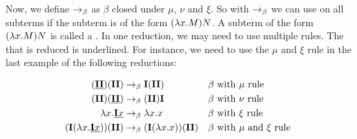 Now, we define $\to_\beta$ as $\beta$ closed under $\mu$, $\nu$ and $\xi$. 
So with $\to_\beta$ we can use \br on all subterms if the subterm is of the form $(\lambda {x}.{M})N$. A subterm of the form $(\lambda {x}.{M})N$ is called a \bre.
In one reduction, we may need to use multiple rules. The \bre that is reduced is underlined.
For instance, we need to use the $\mu$ and $\xi$ rule in the last example of the following reductions: 

\begin{align*}
	(\underline{\mathbf{I} \mathbf{I}})(\mathbf{I} \mathbf{I}) 							&\to_\beta \mathbf{I} (\mathbf{I} \mathbf{I}) 							 & &\beta \text{ with } \mu \text{ rule } \\
	(\mathbf{I} \mathbf{I})(\underline{\mathbf{I} \mathbf{I}}) 							&\to_\beta (\mathbf{I} \mathbf{I}) \mathbf{I} 							 & &\beta \text{ with } \nu \text{ rule } \\
	\lambda {x}.{\underline{\mathbf{I} x}} 								&\to_\beta \lambda {x}.{x} 								 & &\beta \text{ with } \xi \text{ rule } \\
	(\mathbf{I}(\lambda {x}.{\underline{\mathbf{I} x}}))(\mathbf{I} \mathbf{I}) &\to_\beta (\mathbf{I}(\lambda {x}.{x}))(\mathbf{I} \mathbf{I}) & &\beta \text{ with } \mu \text{ and } \xi \text{ rule } \\
\end{align*}
